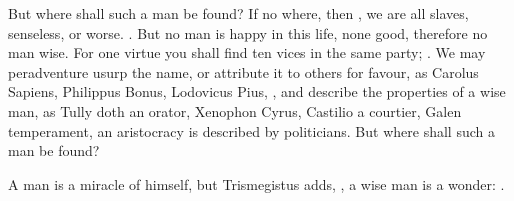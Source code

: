 But where shall such a man be found? If no where, then , we are
all slaves, senseless, or worse. . But no man is happy in
this life, none good, therefore no man wise.  For one virtue
you shall find ten vices in the same party; . We may peradventure usurp the name, or attribute it to others for
favour, as Carolus Sapiens, Philippus Bonus, Lodovicus Pius, \etc{}, and
describe the properties of a wise man, as Tully doth an orator, Xenophon Cyrus,
Castilio a courtier, Galen temperament, an aristocracy is described by
politicians. But where shall such a man be found?


A man is a miracle of himself, but Trismegistus adds, , a wise man is a wonder: .

